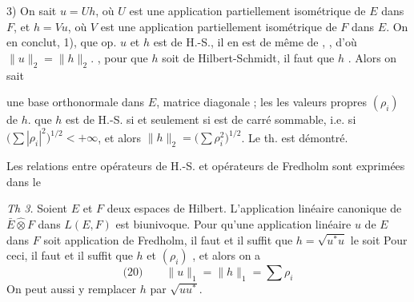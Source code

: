 \documentclass[11pt,a4paper]{article}
\begin{document}
3) On sait   $u = Uh$, où $U$ est une application partiellement isométrique de $E$ dans $F$, et $h = Vu$, où $V$ est une application partiellement isométrique de $F$ dans $E$. On en conclut,  1), que \struck{\ill{}}  op. $u$ et $h$ est de H.-S., il en est de même de ,   \ill{}, d'où    $\|u\|_2 = \|h\|_2$. , pour que $h$ soit \struck{\ill{}} de Hilbert-Schmidt, il faut  que $h$  . Alors on sait

   une base orthonormale  dans $E$, \ill{} \ill{} \ill{} \ill{}   matrice diagonale ; \struck{\ill{}}  les   \struck{\ill{}} \ill{} \ill{}  les valeurs propres $(\rho_i)$ de $h$.    que $h$ est de H.-S. si et seulement si   est de carré sommable, i.e. si $\bigl(\sum |\rho_i|^{2}\bigr)^{1/2} < +\infty$, et   alors $\|h\|_2 = \bigl(\sum \rho_i^{2}\bigr)^{1/2}$. Le th.   est   démontré.

Les relations entre opérateurs de H.-S. et opérateurs de Fredholm sont exprimées dans le

\emph{Th 3.}  Soient $E$ et $F$ deux espaces de Hilbert. L'application linéaire canonique de $\bar{E} \mathbin{\widehat{\otimes}} F$  dans $L(E,F)$ est biunivoque. Pour qu'une application linéaire $u$ de $E$ dans $F$ soit application de Fredholm, il faut et il suffit que $h = \sqrt{u^{*}u}$ le soit  Pour ceci, il faut et il suffit que $h$   et    $(\rho_i)$     \struck{\ill{}}   , et alors on a   \struck{\ill{}}
\[
  \text{(20)}\qquad \|u\|_1 = \|h\|_1 = \sum \rho_i
\]
On peut aussi y remplacer $h$ par $\sqrt{uu^{*}}$. \struck{\ill{}}
\end{document}

